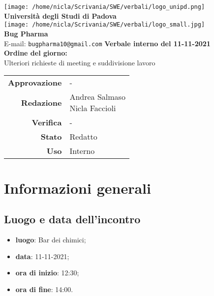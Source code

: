 \documentclass[11pt]{article}
\begin{document}
	\thispagestyle{empty}
	\begin{titlepage}
		\begin{center}
			\texttt{[image: /home/nicla/Scrivania/SWE/verbali/logo\_unipd.png]}\\
			\large \textbf{Università degli Studi di Padova} \\
			\vfill
			\texttt{[image: /home/nicla/Scrivania/SWE/verbali/logo\_small.jpg]}\\
			\large \textbf{Bug Pharma} \\
			\vfill
			\large
			E-mail: 
			\texttt{bugpharma10@gmail.com}
			\vfill
			\Huge \textbf{Verbale interno del 11-11-2021}\\
			\vfill
			\large \textbf{Ordine del giorno:} \\
			Ulteriori richieste di meeting e suddivisione lavoro\\
			\vfill
			
			\large
			\begin{tabular}{r|l}
				\textbf{Approvazione} &  -\\
				\textbf{Redazione} &  \parbox[t]{5cm}{Andrea Salmaso \\Nicla Faccioli}\\
				\textbf{Verifica} &  -\\
				\textbf{Stato} & Redatto \\
				\textbf{Uso} & Interno
			\end{tabular}
			\vfill
			
		\end{center}
	\end{titlepage}
	
	\section{Informazioni generali}
	\subsection{Luogo e data dell'incontro}
	\begin{itemize}
		\item \textbf{luogo}: Bar dei chimici;
		\item \textbf{data}: 11-11-2021;
		\item \textbf{ora di inizio}: 12:30;
		\item \textbf{ora di fine}: 14:00.
	\end{itemize}
	
\end{document}
